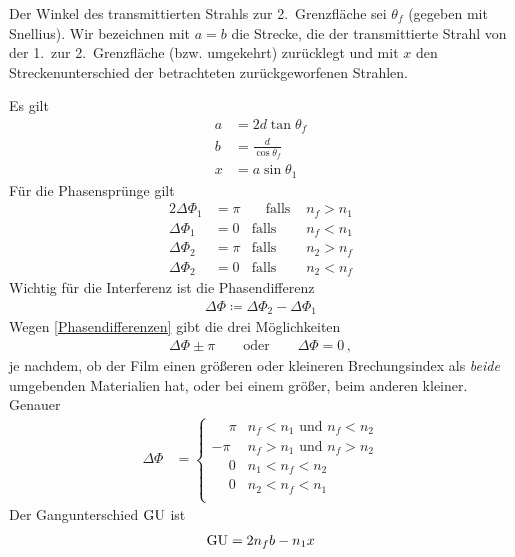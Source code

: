 Der Winkel des transmittierten Strahls zur 2.~Grenzfläche sei
$\theta_f$ (gegeben mit Snellius).
Wir bezeichnen mit $a=b$ die Strecke, die der transmittierte Strahl
von der 1.~zur 2.~Grenzfläche (bzw. umgekehrt) zurücklegt und mit $x$
den Streckenunterschied der betrachteten zurückgeworfenen Strahlen.

Es gilt
\begin{align}\label{*}
  a &= 2d\tan\theta_f \\\nonumber
  b &= \frac{d}{\cos\theta_f}\\\nonumber
  x &= a\sin\theta_1
\end{align}
Für die Phasensprünge gilt
\begin{alignat}{2}\label{Phasendifferenzen}
  \Delta\Phi_1 &= \pi &\quad\text{falls } &n_f>n_1\\\nonumber
  \Delta\Phi_1 &= 0   &\text{falls } &n_f<n_1\\\nonumber
  \Delta\Phi_2 &= \pi &\text{falls } &n_2>n_f\\\nonumber
  \Delta\Phi_2 &= 0   &\text{falls } &n_2<n_f
\end{alignat}
Wichtig für die Interferenz ist die Phasendifferenz
\begin{gather*}
  \Delta\Phi \coloneqq \Delta\Phi_2 - \Delta\Phi_1
\end{gather*}
Wegen \eqref{Phasendifferenzen} gibt die drei Möglichkeiten
\begin{gather*}
  \Delta\Phi \pm \pi  
  \qquad\text{oder}\qquad 
  \Delta\Phi = 0\,,
\end{gather*}
je nachdem, ob der Film einen größeren oder
kleineren Brechungsindex als \emph{beide} umgebenden Materialien hat,
oder bei einem größer, beim anderen kleiner. Genauer
\begin{align*}
  \Delta\Phi 
  &=
    \begin{cases}
      \phantom{-}\pi & n_f<n_1\text{ und }n_f<n_2\\
      -\pi           & n_f>n_1\text{ und }n_f>n_2\\
      \phantom{-}0   & n_1<n_f<n_2\\ 
      \phantom{-}0   & n_2<n_f<n_1\\
    \end{cases}
\end{align*}
Der Gangunterschied $\operatorname{GU}$ ist
\begin{gather*}
  \operatorname{GU} = 2n_f b - n_1x 
\end{gather*}
